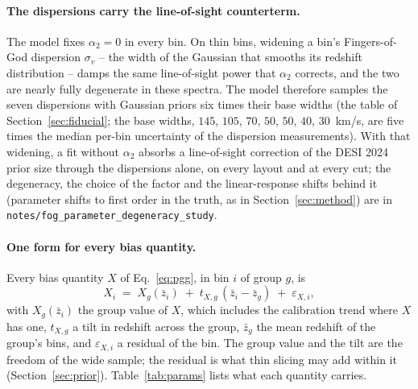 \documentclass[11pt]{article}
\newcommand{\SigBase}{$145$, $105$, $70$, $50$, $50$, $40$, $30$}
\newcommand{\SigVfactor}{six}
\begin{document}
\paragraph{The dispersions carry the line-of-sight counterterm.}
The model fixes $\alpha_2 = 0$ in every bin.  On thin bins, widening a
bin's Fingers-of-God dispersion $\sigma_v$ -- the width of the Gaussian
that smooths its redshift distribution -- damps the same line-of-sight
power that $\alpha_2$ corrects, and the two are nearly fully degenerate
in these spectra.  The model therefore samples the seven dispersions
with Gaussian priors \SigVfactor{} times their base widths (the table
of Section~\ref{sec:fiducial}; the base widths, \SigBase{}~km/s, are
five times the median per-bin uncertainty of the dispersion
measurements).  With that widening, a fit without $\alpha_2$ absorbs a
line-of-sight correction of the DESI 2024 prior size through the
dispersions alone, on every layout and at every cut; the degeneracy,
the choice of the factor and the linear-response shifts behind it
(parameter shifts to first order in the truth, as in
Section~\ref{sec:method}) are
in \texttt{notes/fog\_parameter\_degeneracy\_study}.

\paragraph{One form for every bias quantity.}
Every bias quantity $X$ of Eq.~\eqref{eq:pgg}, in bin $i$ of group
$g$, is
\begin{equation}
  X_i \;=\; X_g(\bar{z}_i) \;+\; t_{X,g}\,(\bar{z}_i - \bar{z}_g)
  \;+\; \varepsilon_{X,i} ,
  \label{eq:generic}
\end{equation}
with $X_g(\bar{z}_i)$ the group value of $X$, which includes the
calibration trend where $X$ has one, $t_{X,g}$ a tilt in redshift
across the group, $\bar{z}_g$ the mean redshift of the group's bins,
and $\varepsilon_{X,i}$ a residual of the bin.  The group value and the
tilt are the freedom of the wide sample; the residual is what thin
slicing may add within it (Section~\ref{sec:prior}).
Table~\ref{tab:params} lists what each quantity carries.
\end{document}
